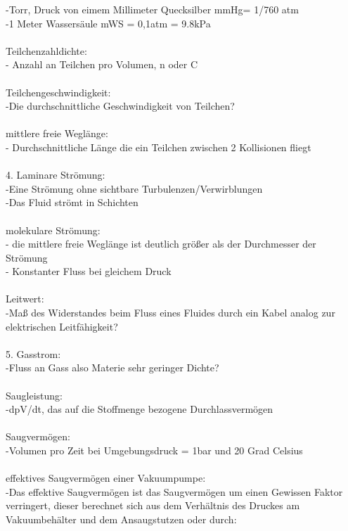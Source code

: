		-Torr, Druck von eimem Millimeter Quecksilber mmHg= 1/760 atm\\
		-1 Meter Wassersäule mWS = 0,1atm = 9.8kPa\\
\\
	   Teilchenzahldichte:\\
	   	- Anzahl an Teilchen pro Volumen, n oder C\\
\\
	   Teilchengeschwindigkeit:\\
		-Die durchschnittliche Geschwindigkeit von Teilchen?\\
\\
	   mittlere freie Weglänge:\\
	   	- Durchschnittliche Länge die ein Teilchen zwischen 2 Kollisionen fliegt\\
\\
	4. Laminare Strömung:\\
		-Eine Strömung ohne sichtbare Turbulenzen/Verwirblungen\\
		-Das Fluid strömt in Schichten\\
\\
	   molekulare Strömung:\\
		- die mittlere freie Weglänge ist deutlich größer als der Durchmesser der Strömung\\
		- Konstanter Fluss bei gleichem Druck\\
\\
	   Leitwert:\\
		-Maß des Widerstandes beim Fluss eines Fluides durch ein Kabel analog zur elektrischen Leitfähigkeit?\\ 
\\
	5. Gasstrom: \\
		-Fluss an Gass also Materie sehr geringer Dichte?\\
\\
	   Saugleistung:\\
		-dpV/dt, das auf die Stoffmenge bezogene Durchlassvermögen\\
\\
	   Saugvermögen:\\
	   	-Volumen pro Zeit bei Umgebungsdruck = 1bar und 20 Grad Celsius\\
\\
	   effektives Saugvermögen einer Vakuumpumpe:\\
	   	-Das effektive Saugvermögen ist das Saugvermögen um einen Gewissen Faktor verringert, dieser berechnet sich aus dem Verhältnis des Druckes am Vakuumbehälter und dem Ansaugstutzen oder durch:\\
